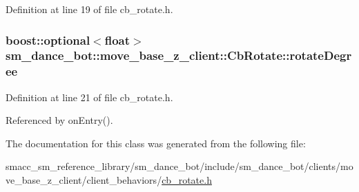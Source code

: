 Definition at line 19 of file cb\+\_\+rotate.\+h.

\subsubsection[{\texorpdfstring{rotate\+Degree}{rotateDegree}}]{\setlength{\rightskip}{0pt plus 5cm}boost\+::optional$<$float$>$ sm\+\_\+dance\+\_\+bot\+::move\+\_\+base\+\_\+z\+\_\+client\+::\+Cb\+Rotate\+::rotate\+Degree}\hypertarget{classsm__dance__bot_1_1move__base__z__client_1_1CbRotate_ab1ecbec2a3e65f6339d176f440e2e2f3}{}\label{classsm__dance__bot_1_1move__base__z__client_1_1CbRotate_ab1ecbec2a3e65f6339d176f440e2e2f3}


Definition at line 21 of file cb\+\_\+rotate.\+h.



Referenced by on\+Entry().



The documentation for this class was generated from the following file\+:\begin{DoxyCompactItemize}
\item 
smacc\+\_\+sm\+\_\+reference\+\_\+library/sm\+\_\+dance\+\_\+bot/include/sm\+\_\+dance\+\_\+bot/clients/move\+\_\+base\+\_\+z\+\_\+client/client\+\_\+behaviors/\hyperlink{smacc__sm__reference__library_2sm__dance__bot_2include_2sm__dance__bot_2clients_2move__base__z__5ee57f5e0712d66d82728a792a27d9fc}{cb\+\_\+rotate.\+h}\end{DoxyCompactItemize}
